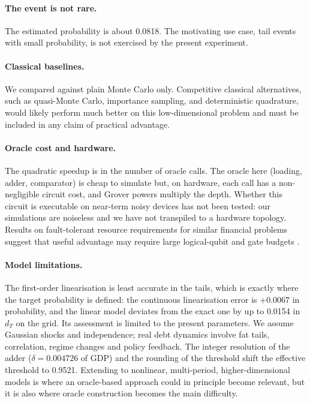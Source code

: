 \documentclass[pdflatex,sn-mathphys-num]{sn-jnl}%
\theoremstyle{thmstyleone}%
\theoremstyle{thmstyletwo}%
\theoremstyle{thmstylethree}%
\begin{document}
\paragraph{The event is not rare.} The estimated probability is about 0.0818. The motivating use case, tail events with small probability, is not exercised by the present experiment.

\paragraph{Classical baselines.} We compared against plain Monte Carlo only. Competitive classical alternatives, such as quasi-Monte Carlo, importance sampling, and deterministic quadrature, would likely perform much better on this low-dimensional problem and must be included in any claim of practical advantage.

\paragraph{Oracle cost and hardware.} The quadratic speedup is in the number of oracle calls. The oracle here (loading, adder, comparator) is cheap to simulate but, on hardware, each call has a non-negligible circuit cost, and Grover powers multiply the depth. Whether this circuit is executable on near-term noisy devices has not been tested: our simulations are noiseless and we have not transpiled to a hardware topology. Results on fault-tolerant resource requirements for similar financial problems suggest that useful advantage may require large logical-qubit and gate budgets \cite{babbush2021focus, chakrabarti2021threshold}.

\paragraph{Model limitations.} The first-order linearisation is least accurate in the tails, which is exactly where the target probability is defined: the continuous linearisation error is \ensuremath{+0.0067} in probability, and the linear model deviates from the exact one by up to 0.0154 in $d_T$ on the grid. Its assessment is limited to the present parameters. We assume Gaussian shocks and independence; real debt dynamics involve fat tails, correlation, regime changes and policy feedback. The integer resolution of the adder ($\delta=0.004726$ of GDP) and the rounding of the threshold shift the effective threshold to 0.9521. Extending to nonlinear, multi-period, higher-dimensional models is where an oracle-based approach could in principle become relevant, but it is also where oracle construction becomes the main difficulty.
\end{document}
